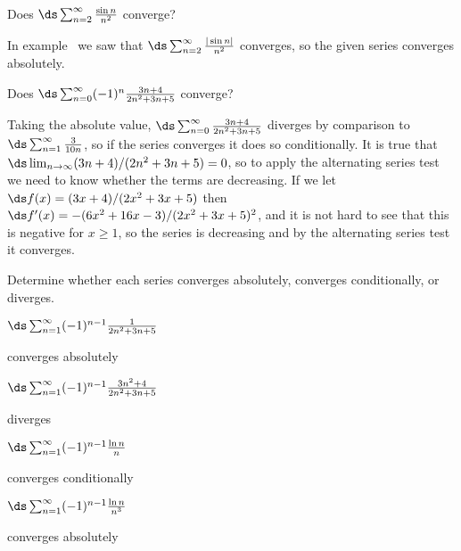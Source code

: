 \begin{theorem}
\begin{example} Does $\ds\sum_{n=2}^\infty {\sin n\over n^2}$ converge?

\ssk\noindent
In example~ we saw that 
$\ds\sum_{n=2}^\infty {|\sin n|\over n^2}$ converges, so the given
series converges absolutely.
\end{example}

\begin{example} Does $\ds\sum_{n=0}^\infty (-1)^{n}{3n+4\over 2n^2+3n+5}$ converge?

\ssk\noindent
Taking the absolute value, $\ds\sum_{n=0}^\infty {3n+4\over 2n^2+3n+5}$
diverges by comparison to $\ds\sum_{n=1}^\infty {3\over 10n}$, so if
the series converges it does so conditionally. It is true that
$\ds\lim_{n\to\infty}(3n+4)/(2n^2+3n+5)=0$, so to apply the
alternating series test we need to know whether the terms are
decreasing.
If we let $\ds f(x)=(3x+4)/(2x^2+3x+5)$ then 
$\ds f'(x)=-(6x^2+16x-3)/(2x^2+3x+5)^2$, and it is not hard to see that
this is negative for $x\ge1$, so the series is decreasing and by the
alternating series test it converges.
\end{example}

\begin{exercises}

Determine whether each series converges absolutely, converges
conditionally, or diverges.

\twocol

\begin{exercise} $\ds\sum_{n=1}^\infty (-1)^{n-1}{1\over 2n^2+3n+5}$
\begin{answer} converges absolutely
\end{answer}\end{exercise}

\begin{exercise} $\ds\sum_{n=1}^\infty (-1)^{n-1}{3n^2+4\over 2n^2+3n+5}$
\begin{answer} diverges
\end{answer}\end{exercise}

\begin{exercise} $\ds\sum_{n=1}^\infty (-1)^{n-1}{\ln n\over n}$
\begin{answer} converges conditionally
\end{answer}\end{exercise}

\begin{exercise} $\ds\sum_{n=1}^\infty (-1)^{n-1} {\ln n\over n^3}$
\begin{answer} converges absolutely
\end{answer}\end{exercise}


\end{exercises}
\end{theorem}
